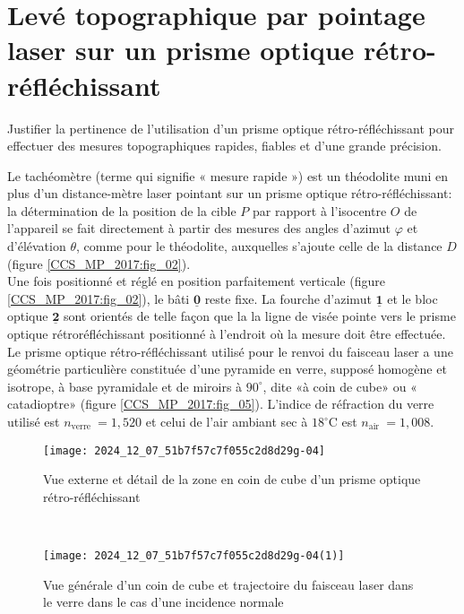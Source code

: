 \section{Levé topographique par pointage laser sur un prisme optique rétro-réfléchissant \label{CCS_MP_2017:p3}}
\begin{obj}
Justifier la pertinence de l'utilisation d'un prisme optique rétro-réfléchissant pour effectuer des mesures topographiques rapides, fiables et d'une grande précision.
\end{obj}

Le tachéomètre (terme qui signifie « mesure rapide ») est un théodolite muni en plus d'un distance-mètre laser pointant sur un prisme optique rétro-réfléchissant: la détermination de la position de la cible $P$ par rapport à l'isocentre $O$ de l'appareil se fait directement à partir des mesures des angles d'azimut $\varphi$ et d'élévation $\theta$, comme pour le théodolite, auxquelles s'ajoute celle de la distance $D$ (figure \ref{CCS_MP_2017:fig_02}).\\
Une fois positionné et réglé en position parfaitement verticale (figure \ref{CCS_MP_2017:fig_02}), le bâti $\underline{\mathbf{0}}$ reste fixe. La fourche d'azimut $\underline{\mathbf{1}}$ et le bloc optique $\underline{\mathbf{2}}$ sont orientés de telle façon que la la ligne de visée pointe vers le prisme optique rétroréfléchissant positionné à l'endroit où la mesure doit être effectuée.\\
Le prisme optique rétro-réfléchissant utilisé pour le renvoi du faisceau laser a une géométrie particulière constituée d'une pyramide en verre, supposé homogène et isotrope, à base pyramidale et de miroirs à $90^{\circ}$, dite «à 
coin de cube» ou « catadioptre» (figure \ref{CCS_MP_2017:fig_05}). L'indice de réfraction du verre utilisé est $n_{\text {verre }}=1,520$ et celui de l'air ambiant sec à $18^{\circ} \mathrm{C}$ est $n_{\text {air }}=1,008$.\\


\begin{figure*}[t!]
    \centering
    \begin{subfigure}[t]{0.5\textwidth}
        \centering
        \texttt{[image: 2024\_12\_07\_51b7f57c7f055c2d8d29g-04]}
        \caption{Vue externe et détail de la zone en coin de cube d'un prisme optique rétro-réfléchissant}
    \end{subfigure}%
    ~ 
    \begin{subfigure}[t]{0.5\textwidth}
        \centering
        \texttt{[image: 2024\_12\_07\_51b7f57c7f055c2d8d29g-04(1)]}
        \caption{Vue générale d'un coin de cube et trajectoire du faisceau laser dans le verre dans le cas d'une incidence normale}
    \end{subfigure}
    \caption{Prisme optique rétro-réfléchissant : photographie et principe du renvoi du faisceau laser \label{CCS_MP_2017:fig_05}}
\end{figure*}




